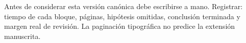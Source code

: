 \documentclass[10pt,a4paper]{article}
\begin{document}
\begin{idea}
Antes de considerar esta versión canónica debe escribirse a mano. Registrar: tiempo de cada bloque, páginas, hipótesis omitidas, conclusión terminada y margen real de revisión. La paginación tipográfica no predice la extensión manuscrita.
\end{idea}
\end{document}
